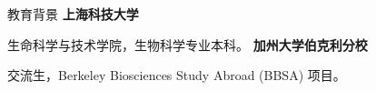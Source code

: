 \begin{rubric}{教育背景}
\entry*[2023 -- 2027]%
	\textbf{上海科技大学}\par
	生命科学与技术学院，生物科学专业本科。
%
\entry*[2026 春季]%
	\textbf{加州大学伯克利分校}\par
	交流生，Berkeley Biosciences Study Abroad (BBSA) 项目。
\end{rubric}

